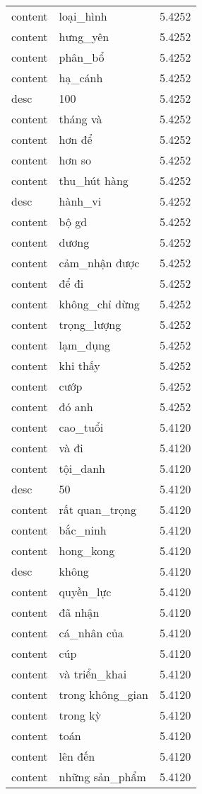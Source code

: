 \documentclass{article}
\begin{document}
\begin{tabular}{lll}
content & loại\_hình & 5.4252\\
content & hưng\_yên & 5.4252\\
content & phân\_bổ & 5.4252\\
content & hạ\_cánh & 5.4252\\
desc & 100 & 5.4252\\
content & tháng và & 5.4252\\
content & hơn để & 5.4252\\
content & hơn so & 5.4252\\
content & thu\_hút hàng & 5.4252\\
desc & hành\_vi & 5.4252\\
content & bộ gd & 5.4252\\
content & dương & 5.4252\\
content & cảm\_nhận được & 5.4252\\
content & để đi & 5.4252\\
content & không\_chỉ dừng & 5.4252\\
content & trọng\_lượng & 5.4252\\
content & lạm\_dụng & 5.4252\\
content & khi thấy & 5.4252\\
content & cướp & 5.4252\\
content & đó anh & 5.4252\\
content & cao\_tuổi & 5.4120\\
content & và đi & 5.4120\\
content & tội\_danh & 5.4120\\
desc & 50 & 5.4120\\
content & rất quan\_trọng & 5.4120\\
content & bắc\_ninh & 5.4120\\
content & hong\_kong & 5.4120\\
desc & không & 5.4120\\
content & quyền\_lực & 5.4120\\
content & đã nhận & 5.4120\\
content & cá\_nhân của & 5.4120\\
content & cúp & 5.4120\\
content & và triển\_khai & 5.4120\\
content & trong không\_gian & 5.4120\\
content & trong kỳ & 5.4120\\
content & toán & 5.4120\\
content & lên đến & 5.4120\\
content & những sản\_phẩm & 5.4120\\

\end{tabular}
\end{document}
